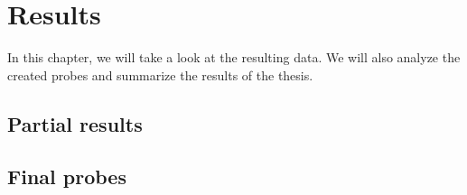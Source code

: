 \chapter[Results]{Results}
\label{kap:results}

In this chapter, we will take a look at the resulting data. We will also analyze the created probes and summarize the results of the thesis.  


\section{Partial results}
\section{Final probes}
